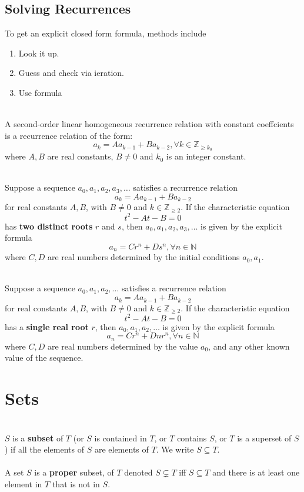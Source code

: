 \documentclass[12pt]{article}
\begin{document}
\subsection{Solving Recurrences}
To get an explicit closed form formula, methods include
\begin{enumerate}
\item Look it up.
\item Guess and check via ieration.
\item Use formula
\end{enumerate}
\begin{definition}
\hfill\\
\normalfont A second-order linear homogeneous recurrence relation with constant coeffcients is a recurrence relation of the form:
\[
a_k=Aa_{k-1}+Ba_{k-2}, \forall k\in\mathbb{Z}_{\geq k_0}
\]
where $A,B$ are real constants, $B\neq 0$ and $k_0$ is an integer constant.
\end{definition}
\begin{theorem}
\hfill\\
\normalfont Suppose a sequence $a_0,a_1,a_2,a_3,\ldots$ satisfies a recurrence relation
\[
a_k=Aa_{k-1}+Ba_{k-2}
\]
for real constants $A,B$, with $B\neq 0$ and $k\in\mathbb{Z}_{\geq 2}$. If the characteristic equation
\[
t^2-At-B=0
\]
has \textbf{two distinct roots} $r$ and $s$, then $a_0,a_1,a_2,a_3,\ldots$ is given by the explicit formula
\[
a_n=Cr^n+Ds^n,\forall n\in\mathbb{N}
\]
where $C,D$ are real numbers determined by the initial conditions  $a_0,a_1$.
\end{theorem}
\begin{theorem}
\hfill\\
\normalfont Suppose a sequence $a_0,a_1,a_2,\ldots$ satisfies a recurrence relation
\[
a_k=Aa_{k-1}+Ba_{k-2}
\]
for real constants $A,B$, with $B\neq 0$ and $k\in\mathbb{Z}_{\geq 2}$. If the characteristic equation
\[
t^2-At-B=0
\]
has a \textbf{single real root} $r$, then $a_0,a_1,a_2,\ldots$ is given by the explicit formula
\[
a_n=Cr^n+Dnr^n,\forall n\in\mathbb{N}
\]
where $C,D$ are real numbers determined by the value $a_0$, and any other known value of the sequence.
\end{theorem}
\clearpage
\section{Sets}
\begin{definition}[Subset(6.1.1)]
\hfill\\
\normalfont
$S$ is a \textbf{subset} of $T$ (or $S$ is contained in $T$, or $T$ contains $S$, or $T$ is a superset of $S$) if all the elements of $S$ are elements of $T$. We write $S\subseteq T$.\\\\
A set $S$ is a \textbf{proper} subset, of $T$ denoted $S\subsetneq T$ iff $S\subseteq T$ and there is at least one element in $T$ that is not in $S$.
\end{definition}
\end{document}
